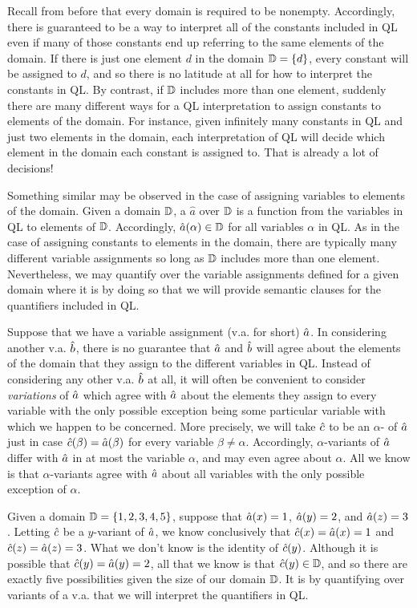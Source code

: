 Recall from before that every domain is required to be nonempty.
Accordingly, there is guaranteed to be a way to interpret all of the constants included in QL even if many of those constants end up referring to the same elements of the domain.
If there is just one element $d$ in the domain $\mathbb{D}=\lbrace d\rbrace$, every constant will be assigned to $d$, and so there is no latitude at all for how to interpret the constants in QL.
By contrast, if $\mathbb{D}$ includes more than one element, suddenly there are many different ways for a QL interpretation to assign constants to elements of the domain. 
For instance, given infinitely many constants in QL and just two elements in the domain, each interpretation of QL will decide which element in the domain each constant is assigned to.
That is already a lot of decisions!

Something similar may be observed in the case of assigning variables to elements of the domain.
Given a domain $\mathbb{D}$, a  $\hat{a}$ over $\mathbb{D}$ is a function from the variables in QL to elements of $\mathbb{D}$.
Accordingly, $\hat{a}(\alpha)\in\mathbb{D}$ for all variables $\alpha$ in QL. 
As in the case of assigning constants to elements in the domain, there are typically many different variable assignments so long as $\mathbb{D}$ includes more than one element. 
Nevertheless, we may quantify over the variable assignments defined for a given domain where it is by doing so that we will provide semantic clauses for the quantifiers included in QL.

Suppose that we have a variable assignment (v.a. for short) $\hat{a}$.
In considering another v.a. $\hat{b}$, there is no guarantee that $\hat{a}$ and $\hat{b}$ will agree about the elements of the domain that they assign to the different variables in QL.
Instead of considering any other v.a. $\hat{b}$ at all, it will often be convenient to consider \textit{variations} of $\hat{a}$ which agree with $\hat{a}$ about the elements they assign to every variable with the only possible exception being some particular variable with which we happen to be concerned.
More precisely, we will take $\hat{c}$ to be an $\alpha$- of $\hat{a}$ just in case $\hat{c}(\beta)=\hat{a}(\beta)$ for every variable $\beta\neq\alpha$.
Accordingly, $\alpha$-variants of $\hat{a}$ differ with $\hat{a}$ in at most the variable $\alpha$, and may even agree about $\alpha$.
All we know is that $\alpha$-variants agree with $\hat{a}$ about all variables with the only possible exception of $\alpha$.

Given a domain $\mathbb{D}=\lbrace1,2,3,4,5\rbrace$, suppose that $\hat{a}(x)=1$, $\hat{a}(y)=2$, and $\hat{a}(z)=3$.
Letting $\hat{c}$ be a $y$-variant of $\hat{a}$, we know conclusively that $\hat{c}(x)=\hat{a}(x)=1$ and $\hat{c}(z)=\hat{a}(z)=3$.
What we don't know is the identity of $\hat{c}(y)$.
Although it is possible that $\hat{c}(y)=\hat{a}(y)=2$, all that we know is that $\hat{c}(y)\in\mathbb{D}$, and so there are exactly five possibilities given the size of our domain $\mathbb{D}$.
It is by quantifying over variants of a v.a. that we will interpret the quantifiers in QL.


